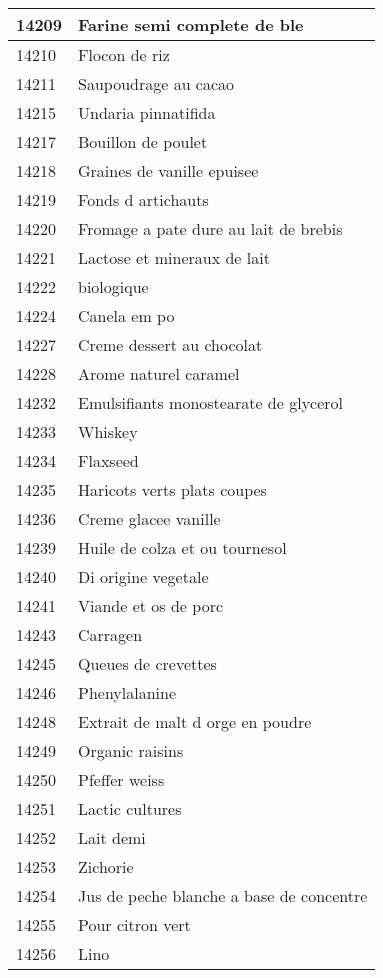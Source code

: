 \begin{longtable}{|l|l|}
14209 & Farine semi complete de ble \\ \hline 
14210 & Flocon de riz \\ \hline 
14211 & Saupoudrage au cacao \\ \hline 
14215 & Undaria pinnatifida \\ \hline 
14217 & Bouillon de poulet \\ \hline 
14218 & Graines de vanille epuisee \\ \hline 
14219 & Fonds d artichauts \\ \hline 
14220 & Fromage a pate dure au lait de brebis \\ \hline 
14221 & Lactose et mineraux de lait \\ \hline 
14222 &  biologique \\ \hline 
14224 & Canela em po \\ \hline 
14227 & Creme dessert au chocolat \\ \hline 
14228 & Arome naturel caramel \\ \hline 
14232 & Emulsifiants monostearate de glycerol \\ \hline 
14233 & Whiskey \\ \hline 
14234 & Flaxseed \\ \hline 
14235 & Haricots verts plats coupes \\ \hline 
14236 & Creme glacee vanille \\ \hline 
14239 & Huile de colza et ou tournesol \\ \hline 
14240 & Di origine vegetale \\ \hline 
14241 & Viande et os de porc \\ \hline 
14243 & Carragen \\ \hline 
14245 & Queues de crevettes \\ \hline 
14246 & Phenylalanine \\ \hline 
14248 & Extrait de malt d orge en poudre \\ \hline 
14249 & Organic raisins \\ \hline 
14250 & Pfeffer weiss \\ \hline 
14251 & Lactic cultures \\ \hline 
14252 & Lait demi \\ \hline 
14253 & Zichorie \\ \hline 
14254 & Jus de peche blanche a base de concentre \\ \hline 
14255 & Pour citron vert \\ \hline 
14256 & Lino \\ \hline 

\end{longtable}
